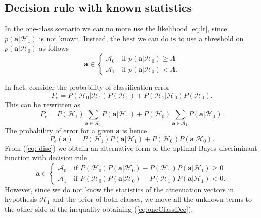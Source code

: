 \documentclass[draftcls,onecolumn,12pt]{IEEEtran}
\begin{document}
\subsection{Decision rule with known statistics}\label{sec:oneClassOpt}
In the one-class scenario we can no more use the likelihood \eqref{eq:lr}, since $p(\mathbf{a}|\mathcal{H}_1)$ is not known. Instead, the best we can do is to use a threshold on $p(\mathbf{a}|\mathcal{H}_0)$ as follows
\begin{equation}
\label{eq:oneClassDec}
\mathbf{a} \in
\begin{cases}
\mathcal{A}_0 \quad \text{if } p(\mathbf{a}|\mathcal{H}_0) \geq \Lambda \\
\mathcal{A}_1 \quad \text{if } p(\mathbf{a}|\mathcal{H}_0) < \Lambda. 
\end{cases}
\end{equation}

In fact, consider the probability of classification error
\begin{equation}
    P_e = P\left(\mathcal{H}_0|\mathcal{H}_1 \right)P\left( \mathcal{H}_1\right)+P\left(\mathcal{H}_1|\mathcal{H}_0 \right)P\left( \mathcal{H}_0\right).
\end{equation}
This can be rewritten as
\begin{equation}
   P_e = P\left( \mathcal{H}_1\right)\sum_{\bm{a} \in \mathcal{A}_0}P\left(\bm{a}|\mathcal{H}_1\right)+P\left( \mathcal{H}_0\right)\sum_{\bm{a} \in \mathcal{A}_1}P\left(\bm{a}|\mathcal{H}_0\right). 
\end{equation}
The probability of error for a given $\bm{a}$ is hence
\begin{equation}\label{eq: disc}
    P_e(\bm{a}) = P\left( \mathcal{H}_1\right)P\left(\bm{a}|\mathcal{H}_1\right)+P\left( \mathcal{H}_0\right)P\left(\bm{a}|\mathcal{H}_0\right).
\end{equation}
From (\ref{eq: disc}) we obtain an alternative form of the optimal Bayes discriminant function with decision rule
\begin{equation}
    \bm{a} \in 
    \begin{cases}
    \mathcal{A}_0 \quad \text{if } P\left( \mathcal{H}_0\right)P\left(\bm{a}|\mathcal{H}_0\right)-P\left( \mathcal{H}_1\right)P\left(\bm{a}|\mathcal{H}_1\right) \geq 0 \\
\mathcal{A}_1 \quad \text{if }
P\left( \mathcal{H}_0\right)P\left(\bm{a}|\mathcal{H}_0\right)-P\left( \mathcal{H}_1\right)P\left(\bm{a}|\mathcal{H}_1\right) < 0. 
    \end{cases}
\end{equation}
However, since we do not know the statistics of the attenuation vectors in hypothesis $\mathcal{H}_1$ and the prior of both classes, we move all the unknown terms to the other side of the inequality obtaining (\ref{eq:oneClassDec}).
\end{document}
